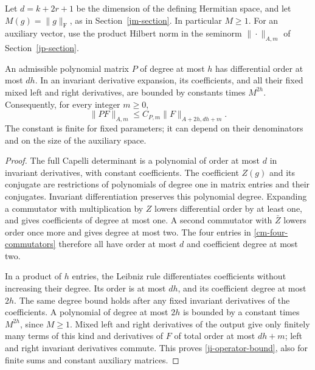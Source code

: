 Let \(d=k+2r+1\) be the dimension of the defining Hermitian space,
and let \(M(g)=\|g\|_{\mathrm F}\), as in
Section~\ref{jm-section}.  In particular \(M\geq1\).
For an auxiliary vector, use the product Hilbert norm in the
seminorm \(\|\cdot\|_{A,m}\) of Section~\ref{jp-section}.

\begin{lemma}\label{ji-degree-order}
An admissible polynomial matrix \(P\) of degree at most \(h\)
has differential order at most \(dh\).  In an invariant
derivative expansion, its coefficients, and all their fixed mixed
left and right derivatives, are bounded by constants times
\(M^{2h}\).  Consequently, for every integer \(m\geq0\),
\begin{equation}\label{ji-operator-bound}
       \|PF\|_{A,m}\leq C_{P,m}\|F\|_{A+2h,dh+m}.
\end{equation}
The constant is finite for fixed parameters; it can depend on their
denominators and on the size of the auxiliary space.
\end{lemma}

\begin{proof}
The full Capelli determinant is a polynomial of order at most
\(d\) in invariant derivatives, with constant coefficients.
The coefficient \(Z(g)\) and its conjugate are restrictions of
polynomials of degree one in matrix entries and their conjugates.
Invariant differentiation preserves this polynomial degree.
Expanding a commutator with multiplication by \(Z\) lowers
differential order by at least one, and gives coefficients of
degree at most one.  A second commutator with \(\bar Z\)
lowers order once more and gives degree at most two.
The four entries in \eqref{cm-four-commutators} therefore all
have order at most \(d\) and coefficient degree at most two.

In a product of \(h\) entries, the Leibniz rule differentiates
coefficients without increasing their degree.  Its order is at most
\(dh\), and its coefficient degree at most \(2h\).
The same degree bound holds after any fixed invariant derivatives
of the coefficients.  A polynomial of degree at most \(2h\)
is bounded by a constant times \(M^{2h}\), since \(M\geq1\).
Mixed left and right derivatives of the output give only finitely
many terms of this kind and derivatives of \(F\) of total order
at most \(dh+m\); left and right invariant derivatives commute.
This proves \eqref{ji-operator-bound}, also for finite sums and
constant auxiliary matrices.
\end{proof}

